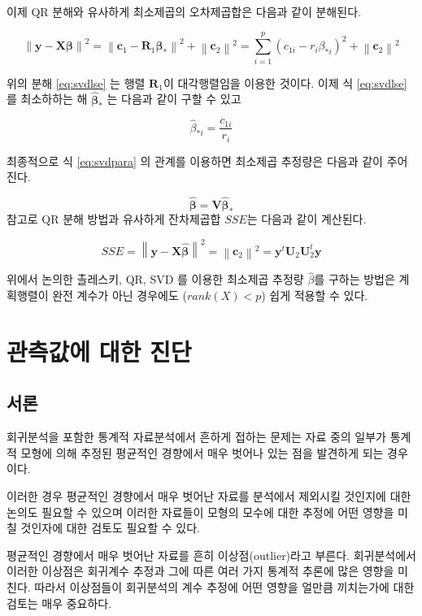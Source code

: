 \documentclass[
]{book}
\makeatletter
\newcommand{\norm}[1]{\left\lVert#1\right\rVert}
\newenvironment{kframe}{%
\medskip{}
\setlength{\fboxsep}{.8em}
 \def\at@end@of@kframe{}%
 \ifinner\ifhmode%
  \def\at@end@of@kframe{\end{minipage}}%
  \begin{minipage}{\columnwidth}%
 \fi\fi%
 \def\FrameCommand##1{\hskip\@totalleftmargin \hskip-\fboxsep
 \colorbox{shadecolor}{##1}\hskip-\fboxsep
     \hskip-\linewidth \hskip-\@totalleftmargin \hskip\columnwidth}%
 \MakeFramed {\advance\hsize-\width
   \@totalleftmargin\z@ \linewidth\hsize
   \@setminipage}}%
 {\par\unskip\endMakeFramed%
 \at@end@of@kframe}
\newenvironment{rmdblock}[1]
  {
  \begin{itemize}
  \renewcommand{\labelitemi}{
    \raisebox{-.7\height}[0pt][0pt]{
      {\setkeys{Gin}{width=3em,keepaspectratio}\texttt{[image: images/\#1]}}
    }
  }
  \setlength{\fboxsep}{1em}
  \begin{kframe}
  \item
  }
  {
  \end{kframe}
  \end{itemize}
  }
\newenvironment{rmdnote}
  {\begin{rmdblock}{note}}
  {\end{rmdblock}}
\theoremstyle{definition}
\theoremstyle{definition}
\theoremstyle{definition}
\theoremstyle{definition}
\theoremstyle{remark}
\makeatother
\begin{document}
이제 QR 분해와 유사하게 최소제곱의 오차제곱합은 다음과 같이 분해된다.

\begin{equation}
\norm{ \bm y-\bm X \bm \beta}^2  = 
\norm{ \bm c_1 - \bm R_1 \bm \beta_* }^2 + \norm{\bm c_2}^2 
 =\sum_{i=1}^p (c_{1i} - r_i \beta_{*i})^2 + \norm{\bm c_2}^2 
\label{eq:svdlse}
\end{equation}

위의 분해 \eqref{eq:svdlse} 는 행렬 \(\bm R_1\)이 대각행렬임을 이용한 것이다. 이제 식 \eqref{eq:svdlse} 를 최소하하는 해
\(\hat {\bm \beta}_*\) 는 다음과 같이 구할 수 있고

\[ \hat \beta_{*i} =\frac{ c_{1i}}{r_i} \]

최종적으로 식 \eqref{eq:svdpara} 의 관계를 이용하면 최소제곱 추정량은 다음과 같이 주어진다.

\[ \hat {\bm \beta} = \bm V \hat {\bm \beta}_* \]
참고로 QR 분해 방법과 유사하게 잔차제곱합 \(SSE\)는 다음과 같이 계산된다.

\[ SSE = \norm{ \bm y-\bm X \hat {\bm \beta}}^2 = \norm{\bm c_2}^2 = \bm y^t \bm U_2 \bm U_2^t \bm y \]

\begin{rmdnote}
위에서 논의한 촐레스키, QR, SVD 를 이용한 최소제곱 추정량 \(\hat \beta\)를 구하는 방법은 계획행렬이
완전 계수가 아닌 경우에도 (\(rank(X)<p\)) 쉽게 적용할 수 있다.
\end{rmdnote}

\hypertarget{residual}{%
\chapter{관측값에 대한 진단}\label{residual}}

\hypertarget{uxc11cuxb860}{%
\section{서론}\label{uxc11cuxb860}}

회귀분석을 포함한 통계적 자료분석에서 흔하게 접하는 문제는 자료 중의
일부가 통계적 모형에 의해 추정된 평균적인 경향에서 매우 벗어나 있는 점을
발견하게 되는 경우이다.

이러한 경우 평균적인 경향에서 매우 벗어난 자료를 분석에서 제외시킬
것인지에 대한 논의도 필요할 수 있으며 이러한 자료들이 모형의 모수에 대한
추정에 어떤 영향을 미칠 것인자에 대한 검토도 필요할 수 있다.

평균적인 경향에서 매우 벗어난 자료를 흔히 이상점(outlier)라고 부른다.
회귀분석에서 이러한 이상점은 회귀계수 추정과 그에 따른 여러 가지 통계적
추론에 많은 영향을 미친다. 따라서 이상점들이 회귀분석의 계수 추정에 어떤
영향을 얼만큼 끼치는가에 대한 검토는 매우 중요하다.
\end{document}
